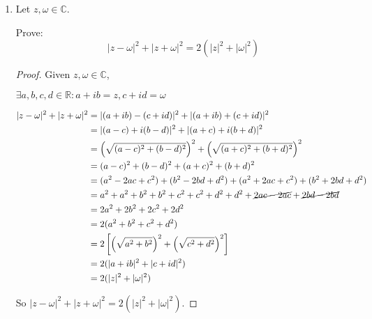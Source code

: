 \documentclass[12pt,letterpaper]{article}
\begin{document}
\begin{enumerate}
\begin{proof}
        Now let's subtract the first equation from the second.
        \[adx_2 - bcx_2 = (ad - bc)x_2 = 0\]

        Again, we assumed that $ad - bc \neq 0$ so we divide by $ad - bc$.
        \[x_2 = 0\]

        So $x_1 = x_2 = 0$.
        Thus if $ad - bc \neq 0$, then $x_1 = x_2 = 0$.

      \end{proof}

    \item
      Let $z, \omega \in \mathbb{C}$.

      Prove:
      \[|z - \omega|^2 + |z + \omega|^2 = 2(|z|^2 + |\omega|^2)\]

      \begin{proof}
        Given $z, \omega \in \mathbb{C}$,

        $\exists a, b, c, d \in \mathbb{R} : a + ib = z, c + id = \omega$

        \begin{align*}
          |z - \omega|^2 + |z + \omega|^2 &=
            |(a + ib) - (c + id)|^2 + |(a + ib) + (c + id)|^2 \\
          &= |(a - c) + i(b - d)|^2 + |(a + c) + i(b + d)|^2 \\
          &= \left(\sqrt{(a - c)^2 + (b - d)^2}\right)^2 +
            \left(\sqrt{(a + c)^2 + (b + d)^2}\right)^2 \\
          &= (a - c)^2 + (b - d)^2 + (a + c)^2 + (b + d)^2 \\
          &= (a^2 - 2ac + c^2) + (b^2 - 2bd + d^2) +
            (a^2 + 2ac + c^2) + (b^2 + 2bd + d^2) \\
          &= a^2 + a^2 + b^2 + b^2 + c^2 + c^2 + d^2 + d^2 +
            \cancel{2ac - 2ac} + \cancel{2bd - 2bd} \\
          &= 2a^2 + 2b^2 + 2c^2 + 2d^2 \\
          &= 2(a^2 + b^2 + c^2 + d^2) \\
          &= 2\left[\left(\sqrt{a^2 + b^2}\right)^2 + \left(\sqrt{c^2 + d^2}\right)^2\right] \\
          &= 2(|a + ib|^2 + |c + id|^2) \\
          &= 2(|z|^2 + |\omega|^2)
        \end{align*}

        So $|z - \omega|^2 + |z + \omega|^2 = 2(|z|^2 + |\omega|^2)$.
      \end{proof}
  \end{enumerate}
\end{document}
